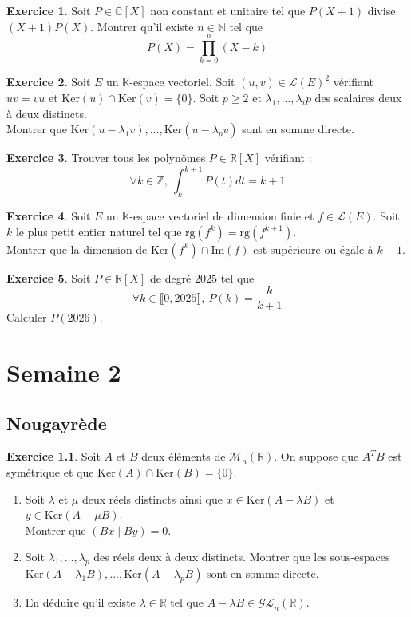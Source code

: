 \documentclass[french]{book}
\newcommand{\N}{\mathbb{N}}
\newcommand{\Z}{\mathbb{Z}}
\newcommand{\R}{\mathbb{R}}
\newcommand{\C}{\mathbb{C}}
\newcommand{\K}{\mathbb{K}}
\renewcommand{\ker}{\text{Ker}}
\theoremstyle{definition}
\newtheorem{ex}{Exercice}[chapter]
\begin{document}
\begin{ex}
	Soit $P\in\C[X]$ non constant et unitaire tel que $P(X+1)$ divise $(X+1)P(X)$. Montrer qu'il existe $n\in\N$ tel que $$P(X)=\prod_{k=0}^{n}(X-k)$$
\end{ex}

\begin{ex}
	Soit $E$ un $\K$-espace vectoriel. Soit $(u,v)\in\mathcal{L}(E)^2$ vérifiant $uv=vu$ et $\ker(u)\cap\ker(v)=\{0\}$. Soit $p\geqslant 2$ et $\lambda_1,\ldots,\lambda_ip$ des scalaires deux à deux distincts. \\ Montrer que $\ker(u-\lambda_1v),\ldots,\ker(u-\lambda_pv)$ sont en somme directe.
\end{ex}

\begin{ex}
	Trouver tous les polynômes $P\in\R[X]$ vérifiant : $$\forall k\in\Z,\ \int_{k}^{k+1}P(t)dt=k+1$$
\end{ex}

\begin{ex}
	Soit $E$ un $\K$-espace vectoriel de dimension finie et $f\in\mathcal{L}(E)$. Soit $k$ le plus petit entier naturel tel que $\text{rg}(f^k)=\text{rg}(f^{k+1})$. \\
	Montrer que la dimension de $\ker(f^k)\cap\text{Im}(f)$ est supérieure ou égale à $k-1$.
\end{ex}

\begin{ex}
	Soit $P\in\R[X]$ de degré $2025$ tel que $$\forall k\in\llbracket0,2025\rrbracket,\ P(k)=\frac{k}{k+1}$$
	Calculer $P(2026)$.
\end{ex}

\chapter{Semaine 2}

\section{Nougayrède}

\begin{ex}
	Soit $A$ et $B$ deux éléments de $\mathcal{M}_n(\R)$. On suppose que $A^TB$ est symétrique et que $\ker(A)\cap\ker(B)=\{0\}$.
	\begin{enumerate}
		\item Soit $\lambda$ et $\mu$ deux réels distincts ainsi que $x\in\ker(A-\lambda B)$ et $y\in\ker(A-\mu B)$. \\
		Montrer que $(Bx\mid By)=0$.
		\item Soit $\lambda_1,\ldots,\lambda_p$ des réels deux à deux distincts. Montrer que les sous-espaces $\ker(A-\lambda_1 B),\ldots,\ker(A-\lambda_p B)$ sont en somme directe.
		\item En déduire qu'il existe $\lambda\in\R$ tel que $A-\lambda B\in\mathcal{GL}_n(\R)$.
	\end{enumerate}
\end{ex}
\end{document}
